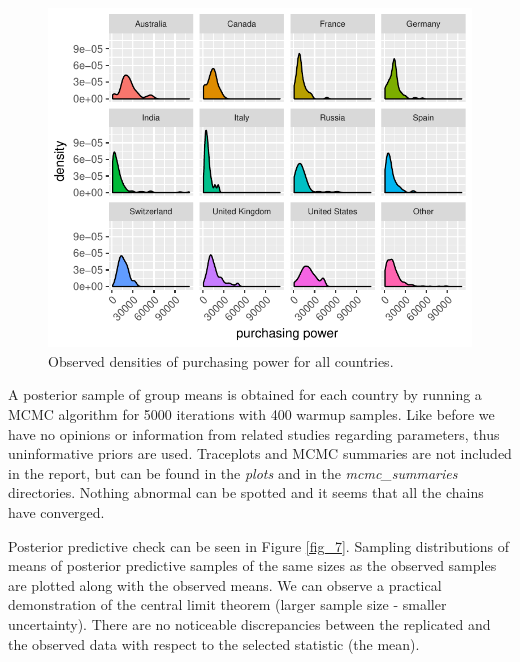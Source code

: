 \documentclass{article}
\begin{document}
\begin{figure}[H]
\centering
\includegraphics{report-023}
\caption{Observed densities of purchasing power for all countries.}\label{fig_6}
\end{figure}

A posterior sample of group means is obtained for each country by running a MCMC algorithm for 5000 iterations with 400 warmup samples. Like before we have no opinions or information from related studies regarding parameters, thus uninformative priors are used. Traceplots and MCMC summaries are not included in the report, but can be found in the \textit{plots} and in the \textit{mcmc\_summaries} directories. Nothing abnormal can be spotted and it seems that all the chains have converged.

Posterior predictive check can be seen in Figure \ref{fig_7}. Sampling distributions of means of posterior predictive samples of the same sizes as the observed samples are plotted along with the observed means. We can observe a practical demonstration of the central limit theorem (larger sample size - smaller uncertainty). There are no noticeable discrepancies between the replicated and the observed data with respect to the selected statistic (the mean).
\end{document}
